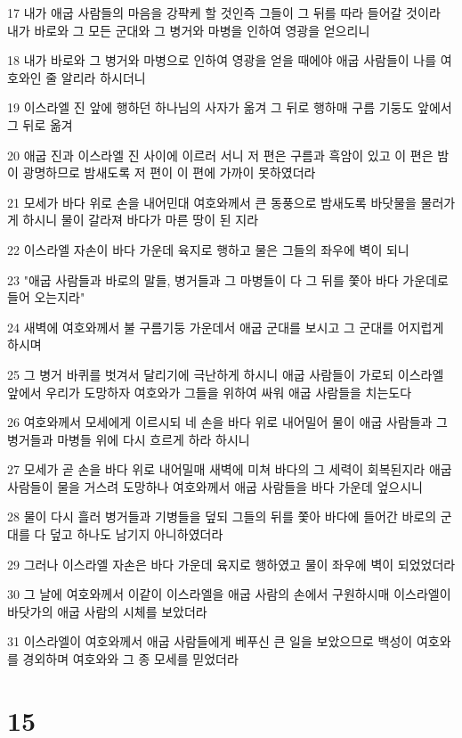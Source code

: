 \par 17 내가 애굽 사람들의 마음을 강퍅케 할 것인즉 그들이 그 뒤를 따라 들어갈 것이라 내가 바로와 그 모든 군대와 그 병거와 마병을 인하여 영광을 얻으리니
\par 18 내가 바로와 그 병거와 마병으로 인하여 영광을 얻을 때에야 애굽 사람들이 나를 여호와인 줄 알리라 하시더니
\par 19 이스라엘 진 앞에 행하던 하나님의 사자가 옮겨 그 뒤로 행하매 구름 기둥도 앞에서 그 뒤로 옮겨
\par 20 애굽 진과 이스라엘 진 사이에 이르러 서니 저 편은 구름과 흑암이 있고 이 편은 밤이 광명하므로 밤새도록 저 편이 이 편에 가까이 못하였더라
\par 21 모세가 바다 위로 손을 내어민대 여호와께서 큰 동풍으로 밤새도록 바닷물을 물러가게 하시니 물이 갈라져 바다가 마른 땅이 된 지라
\par 22 이스라엘 자손이 바다 가운데 육지로 행하고 물은 그들의 좌우에 벽이 되니
\par 23 "애굽 사람들과 바로의 말들, 병거들과 그 마병들이 다 그 뒤를 쫓아 바다 가운데로 들어 오는지라"
\par 24 새벽에 여호와께서 불 구름기둥 가운데서 애굽 군대를 보시고 그 군대를 어지럽게 하시며
\par 25 그 병거 바퀴를 벗겨서 달리기에 극난하게 하시니 애굽 사람들이 가로되 이스라엘 앞에서 우리가 도망하자 여호와가 그들을 위하여 싸워 애굽 사람들을 치는도다
\par 26 여호와께서 모세에게 이르시되 네 손을 바다 위로 내어밀어 물이 애굽 사람들과 그 병거들과 마병들 위에 다시 흐르게 하라 하시니
\par 27 모세가 곧 손을 바다 위로 내어밀매 새벽에 미쳐 바다의 그 세력이 회복된지라 애굽 사람들이 물을 거스려 도망하나 여호와께서 애굽 사람들을 바다 가운데 엎으시니
\par 28 물이 다시 흘러 병거들과 기병들을 덮되 그들의 뒤를 쫓아 바다에 들어간 바로의 군대를 다 덮고 하나도 남기지 아니하였더라
\par 29 그러나 이스라엘 자손은 바다 가운데 육지로 행하였고 물이 좌우에 벽이 되었었더라
\par 30 그 날에 여호와께서 이같이 이스라엘을 애굽 사람의 손에서 구원하시매 이스라엘이 바닷가의 애굽 사람의 시체를 보았더라
\par 31 이스라엘이 여호와께서 애굽 사람들에게 베푸신 큰 일을 보았으므로 백성이 여호와를 경외하며 여호와와 그 종 모세를 믿었더라

\chapter{15}

